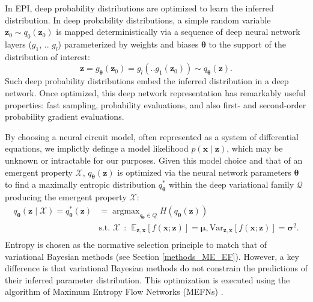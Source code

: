 \documentclass[11pt]{article}
\DeclareMathOperator*{\argmax}{argmax}
\begin{document}
In EPI, deep probability distributions are optimized to learn the inferred distribution.
 In deep probability distributions, a simple random variable $\mathbf{z}_0 \sim q_0(\mathbf{z}_0)$ is mapped deterministically via a sequence of deep neural network layers ($g_1$, .. $g_l$) parameterized by weights and biases $\bm{\theta}$ to the support of the distribution of interest:
\begin{equation}
\label{eq:deep_transform}
\mathbf{z} = g_{\bm{\theta}}(\mathbf{z}_0) = g_l(..g_1(\mathbf{z}_0)) \sim q_{\bm{\theta}}(\mathbf{z}).
\end{equation}
Such deep probability distributions embed the inferred distribution in a deep network.
Once optimized, this deep network representation has remarkably useful properties: fast sampling, probability evaluations, and also first- and second-order probability gradient evaluations.

By choosing a neural circuit model, often represented as a system of differential equations, we implictly definge a model likelihood $p(\mathbf{x} \mid \mathbf{z})$, which may be unknown or intractable for our purposes.  Given this model choice and that of an emergent property $\mathcal{X}$, $q_{\bm{\theta}}(\mathbf{z})$ is optimized via the neural network parameters $\bm{\theta}$ to find a maximally entropic distribution $q_{\bm{\theta}}^*$ within the deep variational family $\mathcal{Q}$ producing the emergent property $\mathcal{X}$:
\begin{equation} \label{eq:opt}
\begin{split}
q_{\bm{\theta}}(\mathbf{z} \mid \mathcal{X}) = q_{\bm{\theta}}^*(\mathbf{z}) &= \argmax_{q_{\bm{\theta}} \in Q} H(q_{\bm{\theta}}(\mathbf{z})) \\
 &  \text{s.t.  } \mathcal{X} ~~:~~ \mathbb{E}_{\mathbf{z},\mathbf{x}}\left[f(\mathbf{x}; \mathbf{z})\right] = \bm{\mu}, \text{Var}_{\mathbf{z},\mathbf{x}}\left[f(\mathbf{x}; \mathbf{z})\right] = \bm{\sigma}^2. \\
 \end{split}
\end{equation} 
Entropy is chosen as the normative selection principle to match that of variational Bayesian methods (see Section \ref{methods_ME_EF}).
However, a key difference is that variational Bayesian methods do not constrain the predictions of their inferred parameter distribution.
This optimization is executed using the algorithm of Maximum Entropy Flow Networks (MEFNs) \cite{loaiza2017maximum}.
\end{document}
